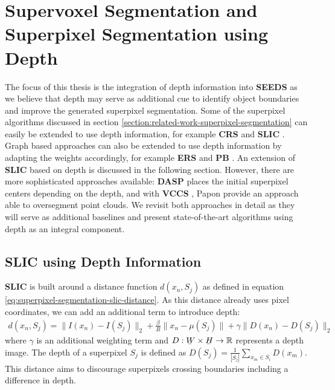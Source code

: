 \chapter{Supervoxel Segmentation and Superpixel Segmentation using Depth}
\label{chapter:superpixel-segmentation-depth}

The focus of this thesis is the integration of depth information into \textbf{SEEDS} \cite{VanDenBerghBoixRoigCapitaniVanGool:2012} as we believe that depth may serve as additional cue to identify object boundaries and improve the generated superpixel segmentation. Some of the superpixel algorithms discussed in section \ref{section:related-work-superpixel-segmentation} can easily be extended to use depth information, for example \textbf{CRS} \cite{ConradMertzMester:2013} and \textbf{SLIC} \cite{AchantaShajiSmithLucchiFuaSuesstrunk:2010}. Graph based approaches can also be extended to use depth information by adapting the weights accordingly, for example \textbf{ERS} \cite{LiuTuzelRamalingamChellappa:2011} and \textbf{PB} \cite{ZhangHartleyMashfordBurn:2011}. An extension of \textbf{SLIC} based on depth is discussed in the following section. However, there are more sophisticated approaches available: \textbf{DASP} \cite{WeikersdorferGossowBeetz:2012} places the initial superpixel centers depending on the depth, and with \textbf{VCCS} \cite{PaponAbramovSchoelerWoergoetter:2013}, Papon \etal provide an approach able to oversegment point clouds. We revisit both approaches in detail as they will serve as additional baselines and present state-of-the-art algorithms using depth as an integral component.

\section{SLIC using Depth Information}
\label{section:superpixel-segmentation-depth-slic3d}

\textbf{SLIC} is built around a distance function $d(x_n, S_j)$ as defined in equation \eqref{eq:superpixel-segmentation-slic-distance}. As this distance already uses pixel coordinates, we can add an additional term to introduce depth:
\begin{align}
	\label{eq:supeprixel-segmentation-depth-slic3d-distance-depth}
	d(x_n, S_j) = \|I(x_n) - I(S_j)\|_2 + \frac{\beta}{R}\|x_n - \mu(S_j)\| + \gamma\|D(x_n) - D(S_j)\|_2
\end{align}
where $\gamma$ is an additional weighting term and $D: \ubar{W} \times \ubar{H} \rightarrow \mathbb{R}$ represents a depth image. The depth of a superpixel $S_j$ is defined as $D(S_j) = \frac{1}{|S_j|} \sum_{x_m \in S_i} D(x_m)$. This distance aims to discourage superpixels crossing boundaries including a difference in depth.

